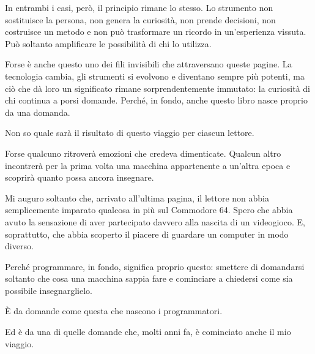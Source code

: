 \documentclass{article}
\begin{document}
In entrambi i casi, però, il principio rimane lo stesso. Lo strumento non sostituisce la persona, non genera la
curiosità, non prende decisioni, non costruisce un metodo e non può trasformare un ricordo in un'esperienza vissuta.
Può soltanto amplificare le possibilità di chi lo utilizza.

Forse è anche questo uno dei fili invisibili che attraversano queste pagine. La tecnologia cambia, gli strumenti si
evolvono e diventano sempre più potenti, ma ciò che dà loro un significato rimane sorprendentemente immutato: la
curiosità di chi continua a porsi domande. Perché, in fondo, anche questo libro nasce proprio da una domanda.

Non so quale sarà il risultato di questo viaggio per ciascun lettore.

Forse qualcuno ritroverà emozioni che credeva dimenticate. Qualcun altro incontrerà per la prima volta una macchina
appartenente a un'altra epoca e scoprirà quanto possa ancora insegnare.

Mi auguro soltanto che, arrivato all'ultima pagina, il lettore non abbia semplicemente imparato qualcosa in più sul
Commodore 64. Spero che abbia avuto la sensazione di aver partecipato davvero alla nascita di un videogioco. E,
soprattutto, che abbia scoperto il piacere di guardare un computer in modo diverso.

Perché programmare, in fondo, significa proprio questo: smettere di domandarsi soltanto che cosa una macchina sappia
fare e cominciare a chiedersi come sia possibile insegnarglielo.

È da domande come questa che nascono i programmatori.

Ed è da una di quelle domande che, molti anni fa, è cominciato anche il mio viaggio.


\bigskip
\end{document}
